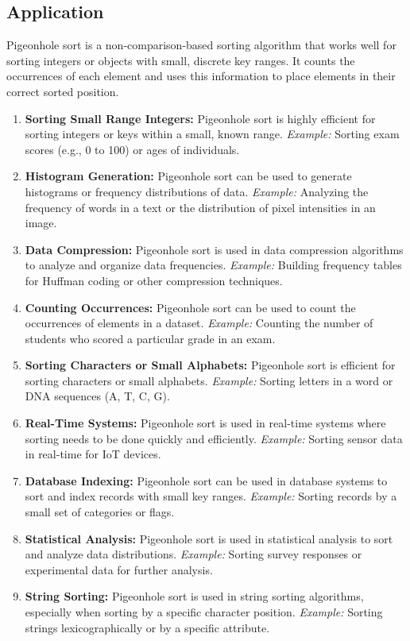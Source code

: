 \subsection{Application}

Pigeonhole sort is a non-comparison-based sorting algorithm that works well for sorting integers or objects with small, discrete key ranges. It counts the occurrences of each element and uses this information to place elements in their correct sorted position.
\begin{enumerate}
    \item \textbf{Sorting Small Range Integers:} Pigeonhole sort is highly efficient for sorting integers or keys within a small, known range. \textit{Example:} Sorting exam scores (e.g., 0 to 100) or ages of individuals.
    \item \textbf{Histogram Generation:} Pigeonhole sort can be used to generate histograms or frequency distributions of data. \textit{Example:} Analyzing the frequency of words in a text or the distribution of pixel intensities in an image.
    \item \textbf{Data Compression:} Pigeonhole sort is used in data compression algorithms to analyze and organize data frequencies. \textit{Example:} Building frequency tables for Huffman coding or other compression techniques.
    \item \textbf{Counting Occurrences:} Pigeonhole sort can be used to count the occurrences of elements in a dataset. \textit{Example:} Counting the number of students who scored a particular grade in an exam.
    \item \textbf{Sorting Characters or Small Alphabets:} Pigeonhole sort is efficient for sorting characters or small alphabets. \textit{Example:} Sorting letters in a word or DNA sequences (A, T, C, G).
    \item \textbf{Real-Time Systems:} Pigeonhole sort is used in real-time systems where sorting needs to be done quickly and efficiently. \textit{Example:} Sorting sensor data in real-time for IoT devices.
    \item \textbf{Database Indexing:} Pigeonhole sort can be used in database systems to sort and index records with small key ranges. \textit{Example:} Sorting records by a small set of categories or flags.
    \item \textbf{Statistical Analysis:} Pigeonhole sort is used in statistical analysis to sort and analyze data distributions. \textit{Example:} Sorting survey responses or experimental data for further analysis.
    \item \textbf{String Sorting:} Pigeonhole sort is used in string sorting algorithms, especially when sorting by a specific character position. \textit{Example:} Sorting strings lexicographically or by a specific attribute.
\end{enumerate}


